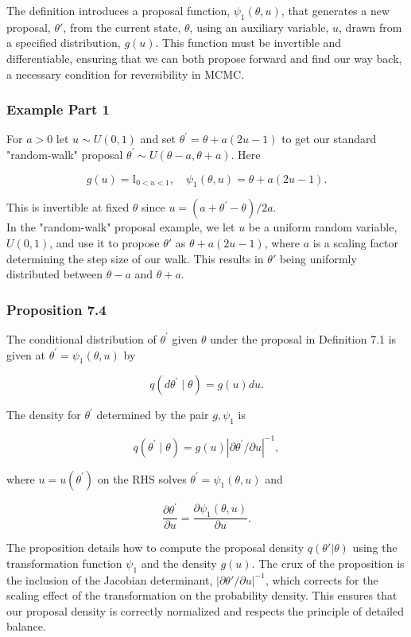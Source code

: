 \documentclass[10pt]{article}
\begin{document}
The definition introduces a proposal function, \(\psi_1(\theta, u)\), that generates a new proposal, \(\theta'\), from the current state, \(\theta\), using an auxiliary variable, \(u\), drawn from a specified distribution, \(g(u)\). This function must be invertible and differentiable, ensuring that we can both propose forward and find our way back, a necessary condition for reversibility in MCMC.

\subsubsection*{Example Part 1}
For $a>0$ let $u \sim U(0,1)$ and set $\theta^{\prime}=\theta+a(2 u-1)$ to get our standard "random-walk" proposal $\theta^{\prime} \sim U(\theta-a, \theta+a)$. Here

$$
g(u)=\mathbb{I}_{0<u<1}, \quad \psi_1(\theta, u)=\theta+a(2 u-1) .
$$

This is invertible at fixed $\theta$ since $u=\left(a+\theta^{\prime}-\theta\right) / 2 a$.\\
In the "random-walk" proposal example, we let \(u\) be a uniform random variable, \(U(0,1)\), and use it to propose \(\theta'\) as \(\theta + a(2u - 1)\), where \(a\) is a scaling factor determining the step size of our walk. This results in \(\theta'\) being uniformly distributed between \(\theta-a\) and \(\theta+a\).

\subsubsection*{Proposition 7.4}
 The conditional distribution of $\theta^{\prime}$ given $\theta$ under the proposal in Definition 7.1 is given at $\theta^{\prime}=\psi_1(\theta, u)$ by

$$
q\left(d \theta^{\prime} \mid \theta\right)=g(u) d u .
$$

The density for $\theta^{\prime}$ determined by the pair $g, \psi_1$ is

$$
q\left(\theta^{\prime} \mid \theta\right)=g(u)\left|\partial \theta^{\prime} / \partial u\right|^{-1},
$$

where $u=u\left(\theta^{\prime}\right)$ on the RHS solves $\theta^{\prime}=\psi_1(\theta, u)$ and

$$
\frac{\partial \theta^{\prime}}{\partial u}=\frac{\partial \psi_1(\theta, u)}{\partial u} .
$$

The proposition details how to compute the proposal density \(q(\theta'|\theta)\) using the transformation function \(\psi_1\) and the density \(g(u)\). The crux of the proposition is the inclusion of the Jacobian determinant, \(|\partial \theta' / \partial u|^{-1}\), which corrects for the scaling effect of the transformation on the probability density. This ensures that our proposal density is correctly normalized and respects the principle of detailed balance.
\end{document}
